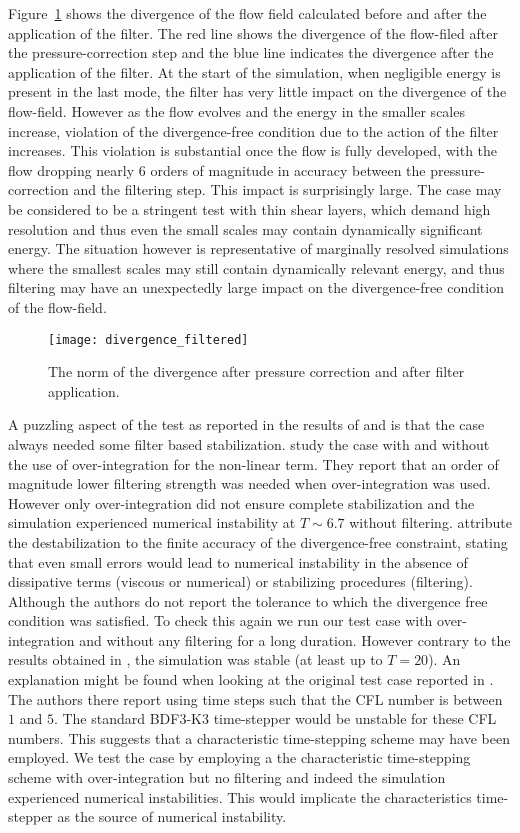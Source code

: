 Figure~\ref{fig:filter_divergence} shows the divergence of the flow field calculated before and after the application of the filter. The red line shows the divergence of the flow-filed after the pressure-correction step and the blue line indicates the divergence after the application of the filter. At the start of the simulation, when negligible energy is present in the last mode, the filter has very little impact on the divergence of the flow-field. However as the flow evolves and the energy in the smaller scales increase, violation of the divergence-free condition due to the action of the filter increases. This violation is substantial once the flow is fully developed, with the flow dropping nearly $6$ orders of magnitude in accuracy between the pressure-correction and the filtering step. This impact is surprisingly large. The case may be considered to be a stringent test with thin shear layers, which demand high resolution and thus even the small scales may contain dynamically significant energy. The situation however is representative of marginally resolved simulations where the smallest scales may still contain dynamically relevant energy, and thus filtering may have an unexpectedly large impact on the divergence-free condition of the flow-field.
\begin{figure}[h]
	\centerline{\texttt{[image: divergence\_filtered]}}
	\caption{\small{The norm of the divergence after pressure correction and after filter application.}}
	\label{fig:filter_divergence}
\end{figure}

A puzzling aspect of the test as reported in the results of \cite{fischer01} and \cite{malm13} is that the case always needed some filter based stabilization. \cite{malm13} study the case with and without the use of over-integration for the non-linear term. They report that an order of magnitude lower filtering strength was needed when over-integration was used. However only over-integration did not ensure complete stabilization and the simulation experienced numerical instability at $T\sim6.7$ without filtering. \cite{malm13} attribute the destabilization to the finite accuracy of the divergence-free constraint, stating that even small errors would lead to numerical instability in the absence of dissipative terms (viscous or numerical) or stabilizing procedures (filtering). Although the authors do not report the tolerance to which the divergence free condition was satisfied. To check this again we run our test case with over-integration and without any filtering for a long duration. However contrary to the results obtained in \cite{malm13}, the simulation was stable (at least up to $T=20$). An explanation might be found when looking at the original test case reported in \cite{fischer01}. The authors there report using time steps such that the CFL number is between $1$ and $5$. The standard BDF3-K3 time-stepper would be unstable for these CFL numbers. This suggests that a characteristic time-stepping scheme may have been employed. We test the case by employing a the characteristic time-stepping scheme with over-integration but no filtering and indeed the simulation experienced numerical instabilities. This would implicate the characteristics time-stepper as the source of numerical instability. 

